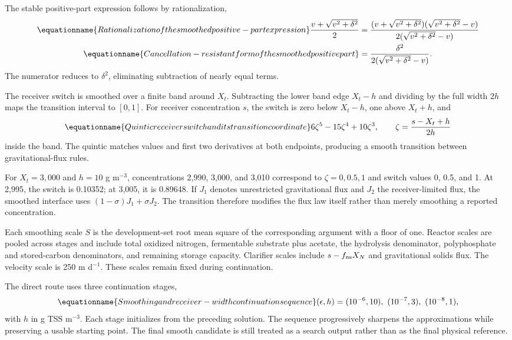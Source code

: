 The stable positive-part expression follows by rationalization,
\begin{align}
\equationname{Rationalization of the smoothed positive-part expression}
\frac{v+\sqrt{v^2+\delta^2}}2
&=\frac{(v+\sqrt{v^2+\delta^2})(\sqrt{v^2+\delta^2}-v)}
{2(\sqrt{v^2+\delta^2}-v)}\\
\equationname{Cancellation-resistant form of the smoothed positive part}
&=\frac{\delta^2}{2(\sqrt{v^2+\delta^2}-v)}.
\end{align}
The numerator reduces to $\delta^2$, eliminating subtraction of nearly equal terms.

The receiver switch is smoothed over a finite band around $X_t$. Subtracting the lower band edge $X_t-h$ and dividing by the full width $2h$ maps the transition interval to $[0,1]$. For receiver concentration $s$, the switch is zero below $X_t-h$, one above $X_t+h$, and
\begin{equation}
\equationname{Quintic receiver switch and its transition coordinate}
6\zeta^5-15\zeta^4+10\zeta^3,\qquad
\zeta=\frac{s-X_t+h}{2h}
\label{eq:plant_receiver_switch}
\end{equation}
inside the band. The quintic matches values and first two derivatives at both endpoints, producing a smooth transition between gravitational-flux rules.

For $X_t=3{,}000$ and $h=10$ g m$^{-3}$, concentrations 2{,}990, 3{,}000, and 3{,}010 correspond to $\zeta=0,0.5,1$ and switch values 0, 0.5, and 1. At 2{,}995, the switch is 0.10352; at 3{,}005, it is 0.89648. If $J_1$ denotes unrestricted gravitational flux and $J_2$ the receiver-limited flux, the smoothed interface uses $(1-\sigma)J_1+\sigma J_2$. The transition therefore modifies the flux law itself rather than merely smoothing a reported concentration.

Each smoothing scale $S$ is the development-set root mean square of the corresponding argument with a floor of one. Reactor scales are pooled across stages and include total oxidized nitrogen, fermentable substrate plus acetate, the hydrolysis denominator, polyphosphate and stored-carbon denominators, and remaining storage capacity. Clarifier scales include $s-f_{\rm ns}X_N$ and gravitational solids flux. The velocity scale is 250 m d$^{-1}$. These scales remain fixed during continuation.

The direct route uses three continuation stages,
\begin{equation}
\equationname{Smoothing and receiver-width continuation sequence}
(\epsilon,h)=(10^{-6},10),\ (10^{-7},3),\ (10^{-8},1),
\label{eq:plant_continuation_sequence}
\end{equation}
with $h$ in g TSS m$^{-3}$. Each stage initializes from the preceding solution. The sequence progressively sharpens the approximations while preserving a usable starting point. The final smooth candidate is still treated as a search output rather than as the final physical reference.

